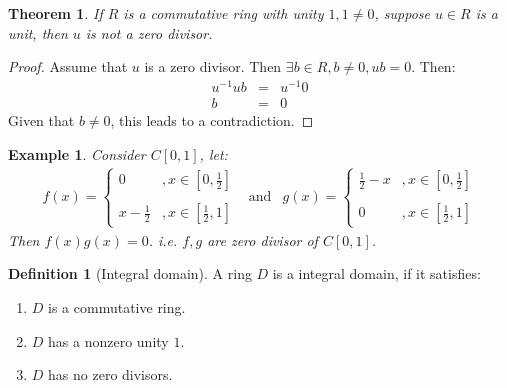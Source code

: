 \documentclass{article}
\theoremstyle{MyNonumberplain}
\theoremstyle{break}
\newtheorem*{proof}{Proof. }
\newcommand{\tmop}{\text}
\theoremstyle{break}
\newtheorem{theorem}{Theorem}[section]
\newtheorem{example}{Example}[section]
\theoremstyle{break}
\theoremstyle{definition}
\theoremstyle{break}
\newtheorem{definition}{Definition}[section]
\begin{document}
\begin{thmbox}
    \begin{theorem}
        If $R$ is a commutative ring with unity $1, 1 \neq 0$, suppose $u \in R$ is a
        unit, then $u$ is not a zero divisor. 
    \end{theorem}
    \begin{prfbox}
        \begin{proof}
            Assume that $u$ is a zero divisor. Then $\exists b \in R, b \neq 0, u b = 0$.
            Then:
            \begin{eqnarray*}
              u^{- 1} u b & = & u^{- 1} 0\\
              b & = & 0
            \end{eqnarray*}
            Given that $b \neq 0$, this leads to a contradiction.
        \end{proof}
    \end{prfbox}
\end{thmbox}

\begin{expbox}
    \begin{example}
        Consider $C [0, 1]$, let:
        \begin{eqnarray*}
          f (x) = \left\{\begin{array}{ll}
            0 & , x \in \left[ 0, \frac{1}{2} \right]\\\\
            x - \frac{1}{2} & , x \in \left[ \frac{1}{2}, 1 \right]
          \end{array}\right. & \tmop{and} & g (x) = \left\{\begin{array}{ll}
            \frac{1}{2} - x & , x \in \left[ 0, \frac{1}{2} \right]\\\\
            0 & , x \in \left[ \frac{1}{2}, 1 \right]
          \end{array}\right.
        \end{eqnarray*}
        Then $f (x) g (x) = 0$. i.e. $f, g$ are zero divisor of $C [0, 1]$.
    \end{example}
\end{expbox}

\begin{defbox}
    \begin{definition}[Integral domain]
        A ring $D$ is a integral domain, if it satisfies:\\
        \begin{enumerate}
          \item $D$ is a commutative ring.\\
          
          \item $D$ has a nonzero unity $1$.\\
          
          \item $D$ has no zero divisors.
        \end{enumerate}
    \end{definition}
\end{defbox}
\end{document}
